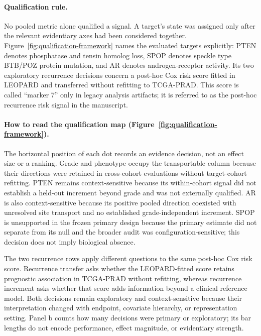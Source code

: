 \paragraph{Qualification rule.}
No pooled metric alone qualified a signal. A target's state was assigned only after the
relevant evidentiary axes had been considered together.
Figure~\ref{fig:qualification-framework} names the evaluated targets explicitly: PTEN denotes
phosphatase and tensin homolog loss, SPOP denotes speckle type BTB/POZ protein mutation, and
AR denotes androgen-receptor activity. Its two exploratory recurrence decisions concern a
post-hoc Cox risk score fitted in LEOPARD and transferred without refitting to TCGA-PRAD.
This score is called ``marker 7'' only in legacy analysis artifacts; it is referred to as the
post-hoc recurrence risk signal in the manuscript.

\paragraph{How to read the qualification map (Figure~\ref{fig:qualification-framework}).}
The horizontal position of each dot records an evidence decision, not an effect size or a
ranking. Grade and phenotype occupy the transportable column because their directions were
retained in cross-cohort evaluations without target-cohort refitting. PTEN remains
context-sensitive because its within-cohort signal did not establish a held-out increment
beyond grade and was not externally qualified. AR is also context-sensitive because its
positive pooled direction coexisted with unresolved site transport and no established
grade-independent increment. SPOP is unsupported in the frozen primary design because the
primary estimate did not separate from its null and the broader audit was
configuration-sensitive; this decision does not imply biological absence.

The two recurrence rows apply different questions to the same post-hoc Cox risk score.
Recurrence transfer asks whether the LEOPARD-fitted score retains prognostic association in
TCGA-PRAD without refitting, whereas recurrence increment asks whether that score adds
information beyond a clinical reference model. Both decisions remain exploratory and
context-sensitive because their interpretation changed with endpoint, covariate hierarchy,
or representation setting. Panel b counts how many decisions were primary or exploratory;
its bar lengths do not encode performance, effect magnitude, or evidentiary strength.


